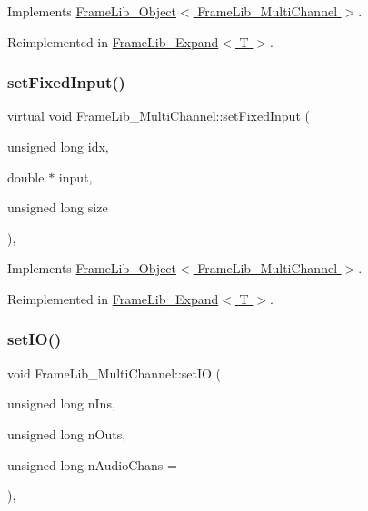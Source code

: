 Implements \hyperlink{class_frame_lib___object_aeb02311ab422dd569aeb982e31a66893}{Frame\+Lib\+\_\+\+Object$<$ Frame\+Lib\+\_\+\+Multi\+Channel $>$}.



Reimplemented in \hyperlink{class_frame_lib___expand_a579f16ec32e05ff84ee766038012fc3f}{Frame\+Lib\+\_\+\+Expand$<$ T $>$}.

\mbox{\label{class_frame_lib___multi_channel_a2bbd1050ff53556bf671282312857301}} 
\subsubsection{\texorpdfstring{set\+Fixed\+Input()}{setFixedInput()}}
{\footnotesize\ttfamily virtual void Frame\+Lib\+\_\+\+Multi\+Channel\+::set\+Fixed\+Input (\begin{DoxyParamCaption}\item[{unsigned long}]{idx,  }\item[{double $\ast$}]{input,  }\item[{unsigned long}]{size }\end{DoxyParamCaption})\hspace{0.3cm}{\ttfamily [inline]}, {\ttfamily [virtual]}}



Implements \hyperlink{class_frame_lib___object_a0d3bed42a21ebf248366f4457722beff}{Frame\+Lib\+\_\+\+Object$<$ Frame\+Lib\+\_\+\+Multi\+Channel $>$}.



Reimplemented in \hyperlink{class_frame_lib___expand_a73f7bf4264d45f56f249d6303b3e4c35}{Frame\+Lib\+\_\+\+Expand$<$ T $>$}.

\mbox{\label{class_frame_lib___multi_channel_aa602f450561447330df32fe73167244b}} 
\subsubsection{\texorpdfstring{set\+I\+O()}{setIO()}}
{\footnotesize\ttfamily void Frame\+Lib\+\_\+\+Multi\+Channel\+::set\+IO (\begin{DoxyParamCaption}\item[{unsigned long}]{n\+Ins,  }\item[{unsigned long}]{n\+Outs,  }\item[{unsigned long}]{n\+Audio\+Chans = {} }\end{DoxyParamCaption})\hspace{0.3cm}{\ttfamily [inline]}, {\ttfamily [protected]}}



